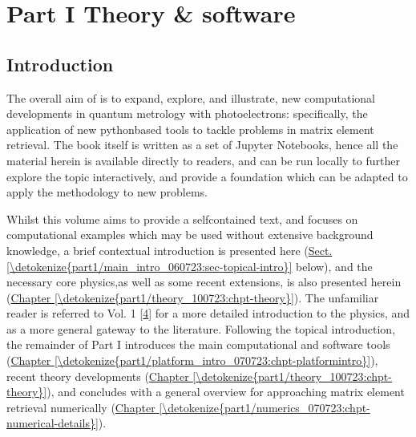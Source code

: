 \documentclass[letterpaper,table,10pt,english]{jupyterBook}
\begin{document}
\sphinxstepscope


\part{Part I \sphinxhyphen{} Theory \& software}

\sphinxstepscope


\chapter{Introduction}
\label{\detokenize{part1/main_intro_060723:introduction}}\label{\detokenize{part1/main_intro_060723:chpt-intro}}\label{\detokenize{part1/main_intro_060723::doc}}
\sphinxAtStartPar
The overall aim of  is to expand, explore, and illustrate, new computational developments in quantum metrology with photoelectrons: specifically, the application of new python\sphinxhyphen{}based tools to tackle problems in matrix element retrieval. The book itself is written as a set of Jupyter Notebooks, hence all the material herein is available directly to readers, and can be run locally to further explore the topic interactively, and provide a foundation which can be adapted to apply the methodology to new problems.

\sphinxAtStartPar
Whilst this volume aims to provide a self\sphinxhyphen{}contained text, and focuses on computational examples which may be used without extensive background knowledge, a brief contextual introduction is presented here (\hyperref[\detokenize{part1/main_intro_060723:sec-topical-intro}]{Sect.\@ \ref{\detokenize{part1/main_intro_060723:sec-topical-intro}}} below), and the  necessary core physics,as well as some recent extensions, is also presented herein (\hyperref[\detokenize{part1/theory_100723:chpt-theory}]{Chapter \ref{\detokenize{part1/theory_100723:chpt-theory}}}). The unfamiliar reader is referred to  Vol. 1 {[}\hyperlink{cite.backmatter/bibliography:id676}{4}{]} for a more detailed introduction to the physics, and as a more general gateway to the literature. Following the topical introduction, the remainder of Part I introduces the main computational and software tools (\hyperref[\detokenize{part1/platform_intro_070723:chpt-platformintro}]{Chapter \ref{\detokenize{part1/platform_intro_070723:chpt-platformintro}}}), recent theory developments (\hyperref[\detokenize{part1/theory_100723:chpt-theory}]{Chapter \ref{\detokenize{part1/theory_100723:chpt-theory}}}), and concludes with a general overview for approaching matrix element retrieval numerically (\hyperref[\detokenize{part1/numerics_070723:chpt-numerical-details}]{Chapter \ref{\detokenize{part1/numerics_070723:chpt-numerical-details}}}).
\end{document}
